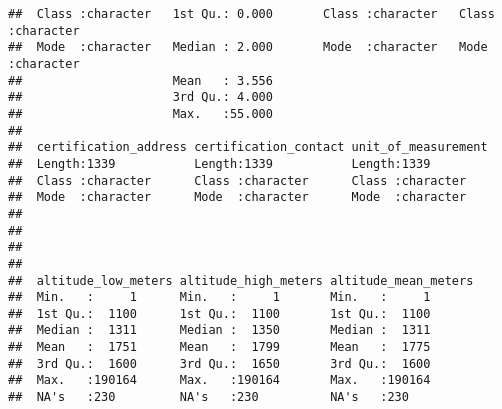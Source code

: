 \documentclass[
]{article}
\begin{document}
\begin{verbatim}
##  Class :character   1st Qu.: 0.000       Class :character   Class :character  
##  Mode  :character   Median : 2.000       Mode  :character   Mode  :character  
##                     Mean   : 3.556                                            
##                     3rd Qu.: 4.000                                            
##                     Max.   :55.000                                            
##                                                                               
##  certification_address certification_contact unit_of_measurement
##  Length:1339           Length:1339           Length:1339        
##  Class :character      Class :character      Class :character   
##  Mode  :character      Mode  :character      Mode  :character   
##                                                                 
##                                                                 
##                                                                 
##                                                                 
##  altitude_low_meters altitude_high_meters altitude_mean_meters
##  Min.   :     1      Min.   :     1       Min.   :     1      
##  1st Qu.:  1100      1st Qu.:  1100       1st Qu.:  1100      
##  Median :  1311      Median :  1350       Median :  1311      
##  Mean   :  1751      Mean   :  1799       Mean   :  1775      
##  3rd Qu.:  1600      3rd Qu.:  1650       3rd Qu.:  1600      
##  Max.   :190164      Max.   :190164       Max.   :190164      
##  NA's   :230         NA's   :230          NA's   :230
\end{verbatim}
\end{document}
